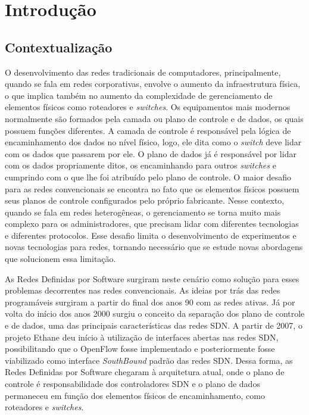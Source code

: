 \chapter{Introdução}

\section{Contextualização}

O desenvolvimento das redes tradicionais de computadores, principalmente, quando se fala em redes corporativas, envolve o aumento da infraestrutura física, o que implica também no aumento da complexidade de gerenciamento de elementos físicos como roteadores e \emph{switches}. Os equipamentos mais modernos normalmente são formados pela camada ou plano de controle e de dados, os quais possuem funções diferentes. A camada de controle é responsável pela lógica de encaminhamento dos dados no nível físico, logo, ele dita como o \emph{switch} deve lidar com os dados que passarem por ele. O plano de dados já é responsável por lidar com os dados propriamente ditos, os encaminhando para outros \emph{switches} e cumprindo com o que lhe foi atribuído pelo plano de controle. O maior desafio para as redes convencionais se encontra no fato que os elementos físicos possuem seus planos de controle configurados pelo próprio fabricante. Nesse contexto, quando se fala em redes heterogêneas, o gerenciamento se torna muito mais complexo para os administradores, que precisam lidar com diferentes tecnologias e diferentes protocolos. Esse desafio limita o desenvolvimento de experimentos e novas tecnologias para redes, tornando necessário que se estude novas abordagens que solucionem essa limitação.
\par As Redes Definidas por Software surgiram neste cenário como solução para esses problemas decorrentes nas redes convencionais. As ideias por trás das redes programáveis surgiram a partir do final dos anos 90 com as redes ativas. Já por volta do início dos anos 2000 surgiu o conceito da separação dos plano de controle e de dados, uma das principais características das redes SDN. A partir de 2007, o projeto Ethane deu início à utilização de interfaces abertas nas redes SDN, possibilitando que o OpenFlow fosse implementado e posteriormente fosse viabilizado como interface \emph{SouthBound} padrão das redes SDN.\cite{Feamster:2013:RS:2559899.2560327} Dessa forma, as Redes Definidas por Software chegaram à arquitetura atual, onde o plano de controle é responsabilidade dos controladores SDN e o plano de dados permaneceu em função dos elementos físicos de encaminhamento, como roteadores e \emph{switches}.
